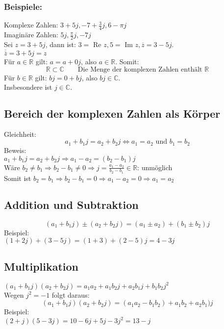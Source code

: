 \subsubsection{Beispiele:}
Komplexe Zahlen: $3 + 5 j, -7 + \frac{3}{4} j, 6 - \pi j$\\
Imaginäre Zahlen: $5 j, \frac{\pi}{2} j, -7 j$\\
Sei $z = 3 + 5 j$, dann ist: $3 =$ Re $z, 5 =$ Im $z, \overline{z} = 3 - 5 j$. \\
$\overline{\overline{z}} = 3 + 5 j = z$\\
Für $a \in \mathbb{R}$ gilt: $a = a + 0 j$, also $a \in \mathbb{R}$. Somit: 
\[ \boxed{\mathbb{R} \subset \mathbb{C}} \qquad \text{Die Menge der komplexen Zahlen enthält $\mathbb{R}$} \]
Für $b \in \mathbb{R}$ gilt: $b j = 0 + b j$, also $b j \in \mathbb{C}$. \\
Insbesondere ist $j \in \mathbb{C}$. 

\subsection{Bereich der komplexen Zahlen als Körper}
Gleichheit: 
\[ \boxed{a_1 + b_1 j = a_2 + b_2 j \Leftrightarrow a_1 = a_2\text{ und }b_1 = b_2} \]
Beweis: \\
$a_1 + b_1 j = a_2 + b_2 j \Rightarrow a_1 - a_2 = (b_2 - b_1) j$\\
Wäre $b_2 \neq b_1 \Rightarrow b_2 - b_1 \neq 0 \Rightarrow j = \frac{a_1 - a_2}{b_2 - b_1} \in \mathbb{R}$: unmöglich\\
Somit ist $b_2 = b_1 \Rightarrow b_2 - b_1 = 0 \Rightarrow a_1 - a_2 = 0 \Rightarrow a_1 = a_2$

\subsection{Addition und Subtraktion}
\[ \boxed{(a_1 + b_1 j) \pm (a_2 + b_2 j) = (a_1 \pm a_2) + (b_1 \pm b_2) j} \]
Beispiel: \\
$(1 + 2 j) + (3 - 5 j) = (1 + 3) + (2 - 5) j = 4 - 3 j $

\subsection{Multiplikation}
$(a_1 + b_1 j) (a_2 + b_2 j) = a_1 a_2 + a_1 b_2 j + a_2 b_1 j + b_1 b_2 j^2$\\
Wegen $j^2 = -1$ folgt daraus: 
\[ \boxed{(a_1 + b_1 j) (a_2 + b_2 j) = (a_1 a_2 - b_1 b_2) + a_1 b_2 + a_2 b_1) j} \]
Beispiel: \\
$(2 + j) (5 - 3 j) = 10 - 6 j + 5 j - 3 j^2 = 13 - j$

